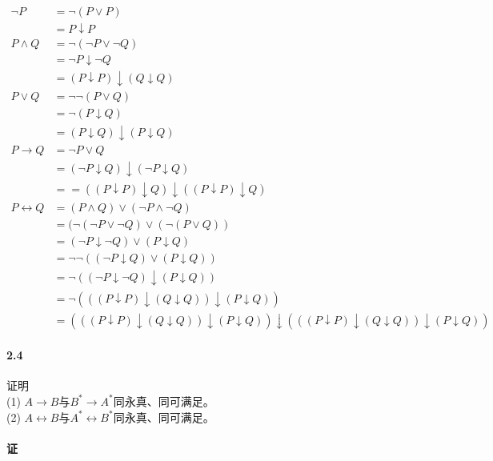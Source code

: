 \documentclass[hyperref, UTF8]{ctexart}
\begin{document}
\begin{align*}
\lnot P &= \lnot (P \lor P) \\&= P \downarrow P \\
P \land Q &= \lnot ( \lnot P \lor \lnot Q) \\&= \lnot P \downarrow \lnot Q \\&= (P \downarrow P) \downarrow (Q \downarrow Q) \\
P \lor Q &= \lnot \lnot (P \lor Q) \\&= \lnot (P \downarrow Q) \\&= (P \downarrow Q) \downarrow (P \downarrow Q) \\
P \rightarrow Q &= \lnot P \lor Q \\&= ( \lnot P \downarrow Q) \downarrow ( \lnot P \downarrow Q) \\&= =((P \downarrow P) \downarrow Q) \downarrow ((P \downarrow P) \downarrow Q) \\
P \leftrightarrow Q &= (P \land Q) \lor ( \lnot P \land \lnot Q) \\&= ( \lnot ( \lnot P \lor \lnot Q) \lor ( \lnot (P \lor Q)) \\&= ( \lnot P \downarrow \lnot Q) \lor (P \downarrow Q) \\&= \lnot \lnot (( \lnot P \downarrow Q) \lor (P \downarrow Q)) \\&= \lnot (( \lnot P \downarrow \lnot Q) \downarrow (P \downarrow Q)) \\&= \lnot (((P \downarrow P) \downarrow (Q \downarrow Q)) \downarrow (P \downarrow Q)) \\&= (((P \downarrow P) \downarrow (Q \downarrow Q)) \downarrow (P \downarrow Q)) \downarrow (((P \downarrow P) \downarrow (Q \downarrow Q)) \downarrow (P \downarrow Q))
\end{align*}

\paragraph{2.4}\label{2.4}
证明 \\

(1) $A\rightarrow B$与$B^*\rightarrow A^*$同永真、同可满足。\\

(2) $A\leftrightarrow B$与$A^*\leftrightarrow B^*$同永真、同可满足。\\

\paragraph{证}
\end{document}
